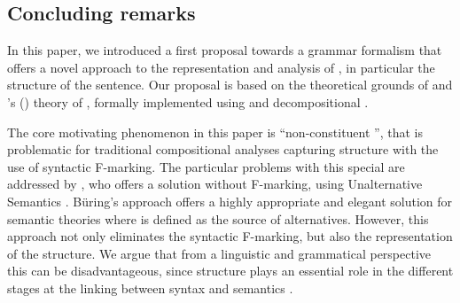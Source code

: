 \documentclass[output=paper,colorlinks,citecolor=brown]{langscibook}
\begin{document}
\subsection{Concluding remarks}
In this paper, we introduced a first proposal towards a grammar formalism that offers a novel approach to the representation and analysis of , in particular the  structure of the sentence. Our proposal is based on the theoretical grounds of  \citep{vvlp:97,vanvalin:05} and \citeauthor{lambrecht:94}'s (\citeyear{lambrecht:94}) theory of , formally implemented using  \citep{kallm:etal:13,kallm:ossw:23} and decompositional  \citep{kallm:ossw:13,lobner:14,petersen:15}.

The core motivating phenomenon in this paper is ``non-constituent '', that is problematic for traditional compositional analyses capturing  structure with the use of syntactic F-marking. The particular problems with this special  are addressed by \citet{buring:16}, who offers a solution without F-marking, using Unalternative Semantics \citep{buring:06,buring:15}. B\"uring's approach offers a highly appropriate and elegant solution for semantic theories where  is defined as the source of alternatives. However, this approach not only eliminates the syntactic F-marking, but also the representation of the  structure. We argue that from a linguistic and grammatical perspective this can be disadvantageous, since  structure plays an essential role in the different stages at the linking between syntax and semantics \citep[][]{bentley:23,lvv:23,vanvalin:05}.
\end{document}
